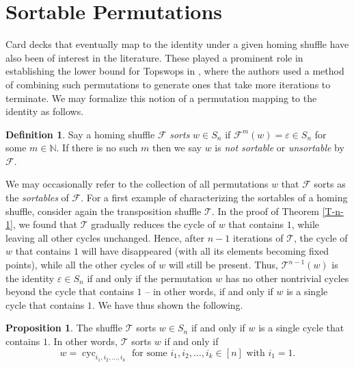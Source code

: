 \documentclass[final,nomarks]{dmtcs-episciences}
\theoremstyle{definition}
\newtheorem{prop}[thm]{Proposition}
\theoremstyle{definition}
\newtheorem{defn}[thm]{Definition}
\theoremstyle{remark}
\newcommand{\f}{\mathcal{F}} %
\newcommand{\T}{\mathcal{T}} %
\newcommand{\id}{\varepsilon} %
\newcommand{\tup}[1]{\left( #1 \right)}
\newcommand{\cyc}[1]{\operatorname{cyc}_{#1}}
\begin{document}
\section{Sortable Permutations}
Card decks that eventually map to the identity under a given homing shuffle have also been of interest in the literature.
These played a prominent role in establishing the lower bound for Topswops in \cite{morales2010}, where the authors used a method of combining such permutations to generate ones that take more iterations to terminate. 
We may formalize this notion of a permutation mapping to the identity as follows.
\begin{defn}
    Say a homing shuffle $ \f $ \emph{sorts} $  w \in S_{n}$ if $ \f^{m}\tup{ w } = \id \in S_{n} $ for some $ m \in \mathbb{N} $. If there is no such $m$ then we say $w$ is  \emph{not sortable} or \emph{unsortable} by $\f$.
\end{defn}
We may occasionally refer to the collection of all permutations $w$ that $\f$ sorts as the \emph{sortables} of $\f$.
For a first example of characterizing the sortables of a homing shuffle, consider again the transposition shuffle $\T$.
In the proof of Theorem \ref{T-n-1}, we found that $\T$ gradually reduces the cycle of $w$ that contains $1$, while leaving all other cycles unchanged.
Hence, after $n-1$ iterations of $\T$, the cycle of $w$ that contains $1$ will have disappeared (with all its elements becoming fixed points), while all the other cycles of $w$ will still be present.
Thus, $\T^{n-1}\tup{w}$ is the identity $ \id \in S_{n} $ if and only if the permutation $w$ has no other nontrivial cycles beyond the cycle that contains $1$ -- in other words, if and only if $ w $ is a single cycle that contains $1$.
We have thus shown the following.
\begin{prop}
    \label{sortableT}
    The shuffle $ \T $ sorts $ w \in S_{n} $ if and only if $ w $ is a single cycle that contains $1$. In other words, $ \T $ sorts $ w $ if and only if
    \[
        w = \cyc{i_{1},i_{2},\dots,i_{k}} \text{ for some } i_1,i_2,\dots,i_k \in [n] \text{ with } i_1 = 1.
    \]
\end{prop}
\end{document}
